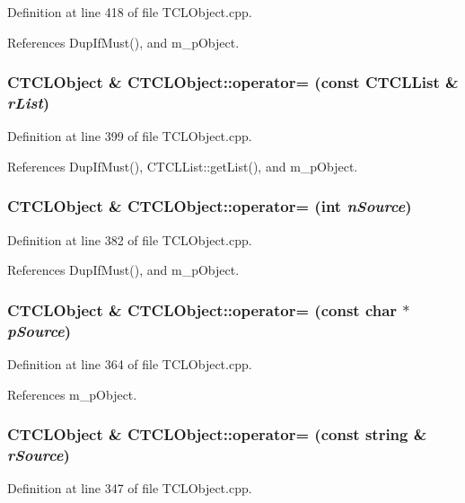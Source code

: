 Definition at line 418 of file TCLObject.cpp.

References Dup\-If\-Must(), and m\_\-p\-Object.
\subsubsection{\setlength{\rightskip}{0pt plus 5cm}CTCLObject \& CTCLObject::operator= (const {\bf CTCLList} \& {\em r\-List})}\label{classCTCLObject_a10}




Definition at line 399 of file TCLObject.cpp.

References Dup\-If\-Must(), CTCLList::get\-List(), and m\_\-p\-Object.
\subsubsection{\setlength{\rightskip}{0pt plus 5cm}CTCLObject \& CTCLObject::operator= (int {\em n\-Source})}\label{classCTCLObject_a9}




Definition at line 382 of file TCLObject.cpp.

References Dup\-If\-Must(), and m\_\-p\-Object.
\subsubsection{\setlength{\rightskip}{0pt plus 5cm}CTCLObject \& CTCLObject::operator= (const char $\ast$ {\em p\-Source})}\label{classCTCLObject_a8}




Definition at line 364 of file TCLObject.cpp.

References m\_\-p\-Object.
\subsubsection{\setlength{\rightskip}{0pt plus 5cm}CTCLObject \& CTCLObject::operator= (const string \& {\em r\-Source})}\label{classCTCLObject_a7}




Definition at line 347 of file TCLObject.cpp.

